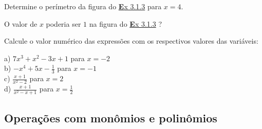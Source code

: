\begin{description}[leftmargin=\dimexpr\widest+\labelsep\relax,labelindent=0pt,
    labelwidth=\widest]
\item[\thesubsection.\theexercicio]\label{ex:3.1.3}
Determine o perímetro da figura do \hyperref[ex:3.1.3]{\textbf Ex 3.1.3} para $x = 4$.

\item[\thesubsection.\theexercicio]
O valor de $x$ poderia ser $1$ na figura do \hyperref[ex:3.1.3]{\textbf Ex 3.1.3} ?

\newpage
{}
\item[\thesubsection.\theexercicio]
Calcule o valor numérico das expressões com os respectivos valores das variáveis:

\begin{multicols}{2}\large
a) $7x^3 + x^2 - 3x + 1$ para $x = -2$\\
b) $ - x^4 + 5x - \frac{1}{3}$ para $x = - 1$\\
c) $\frac{x+1}{x^2-2}$ para $x = 2$\\
d) $\frac{x+1}{x^2-x+1}$ para $x=\frac{1}{2}$
\end{multicols}\normalsize

\end{description}

\subsection{Operações com monômios e polinômios}

\begin{center}\end{center}

